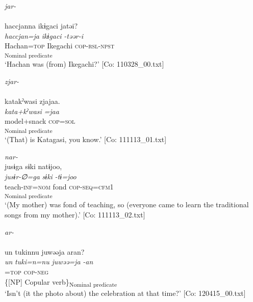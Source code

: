 \ea \label{ex:4.13}
\ea   \textit{jar-} \label{ex:4.13a}\\\\
    \gllll haccjanna  ikɨgaci  jatəi?\\
      \textit{haccjan=ja}  \textit{ikɨgaci}  \textit{-təər-i}\\
      Hachan=\textsc{top}  Ikegachi  \textsc{cop}-\textsc{rsl}-\textsc{npst}\\
        [NP  Copular verb]\textsubscript{Nominal predicate}\\
    \glt       ‘Hachan was (from) Ikegachi?’      [Co: 110328\_00.txt]

\ex \textit{zjar-}\\\\
\gllll    katakˀwasi  zjajaa.\\
      \textit{kata+kˀwasi}  \textit{=jaa}\\
      model+snack  \textsc{cop}=\textsc{sol}\\
      [NP  Copular verb]\textsubscript{Nominal predicate}\\
      \glt       ‘(That) is Katagasi, you know.’ [Co: 111113\_01.txt]

\ex  \textit{nar-}\\
\gllll   jusɨga  sɨki  natɨjoo,\\
      \textit{jusɨr-∅=ga}  \textit{sɨki}  \textit{-tɨ=joo}\\
      teach-\textsc{inf}=\textsc{nom}  fond  \textsc{cop}-\textsc{seq}=\textsc{cfm}1\\
        [NP  Copular verb]\textsubscript{Nominal predicate}\\
      \glt       ‘(My mother) was fond of teaching, so (everyone came to learn the traditional songs from my mother).’ [Co: 111113\_02.txt]

\ex  \textit{ar-}\\\\
\gllll     un  tukinnu  juwəəja  aran?\\
      \textit{un}  \textit{tuki=n=nu}  \textit{juwəə=ja}  \textit{-an}\\
      [that  time=\textsc{dat}1=\textsc{gen}  celebration]=\textsc{top}  \textsc{cop}-\textsc{neg}\\
      \{[NP]  Copular verb\}\textsubscript{Nominal predicate}\\
      \glt       ‘Isn't (it the photo about) the celebration at that time?’ [Co: 120415\_00.txt]
    \z
\z

